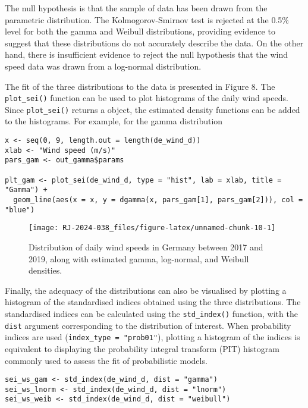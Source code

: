 The null hypothesis is that the sample of data has been drawn from the parametric distribution. The Kolmogorov-Smirnov test is rejected at the 0.5\% level for both the gamma and Weibull distributions, providing evidence to suggest that these distributions do not accurately describe the data. On the other hand, there is insufficient evidence to reject the null hypothesis that the wind speed data was drawn from a log-normal distribution.

The fit of the three distributions to the data is presented in Figure 8. The \texttt{plot\_sei()} function can be used to plot histograms of the daily wind speeds. Since \texttt{plot\_sei()} returns a  object, the estimated density functions can be added to the histograms. For example, for the gamma distribution

\begin{verbatim}
x <- seq(0, 9, length.out = length(de_wind_d))
xlab <- "Wind speed (m/s)"
pars_gam <- out_gamma$params

plt_gam <- plot_sei(de_wind_d, type = "hist", lab = xlab, title = "Gamma") +
  geom_line(aes(x = x, y = dgamma(x, pars_gam[1], pars_gam[2])), col = "blue")
\end{verbatim}

\begin{figure}

{\centering \texttt{[image: RJ-2024-038\_files/figure-latex/unnamed-chunk-10-1]} 

}

\caption{Distribution of daily wind speeds in Germany between 2017 and 2019, along with estimated gamma, log-normal, and Weibull densities.}\label{fig:unnamed-chunk-10}
\end{figure}

Finally, the adequacy of the distributions can also be visualised by plotting a histogram of the standardised indices obtained using the three distributions. The standardised indices can be calculated using the \texttt{std\_index()} function, with the \texttt{dist} argument corresponding to the distribution of interest. When probability indices are used (\texttt{index\_type\ =\ "prob01"}), plotting a histogram of the indices is equivalent to displaying the probability integral transform (PIT) histogram commonly used to assess the fit of probabilistic models.

\begin{verbatim}
sei_ws_gam <- std_index(de_wind_d, dist = "gamma")
sei_ws_lnorm <- std_index(de_wind_d, dist = "lnorm")
sei_ws_weib <- std_index(de_wind_d, dist = "weibull")
\end{verbatim}

